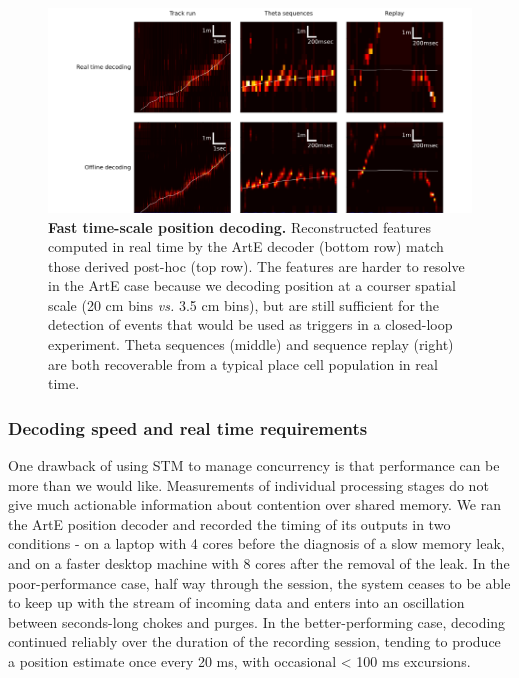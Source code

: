 \documentclass[]{article}
\begin{document}
\begin{figure}[htbp]
\centering
\includegraphics{./finalFigs/headToHeadDecoding.png}
\caption{\textbf{Fast time-scale position decoding.} Reconstructed
features computed in real time by the ArtE decoder (bottom row) match
those derived post-hoc (top row). The features are harder to resolve in
the ArtE case because we decoding position at a courser spatial scale
(20 cm bins \emph{vs.} 3.5 cm bins), but are still sufficient for the
detection of events that would be used as triggers in a closed-loop
experiment. Theta sequences (middle) and sequence replay (right) are
both recoverable from a typical place cell population in real time.}
\end{figure}

\subsubsection{Decoding speed and real time requirements}

One drawback of using STM to manage concurrency is that performance can
be more than we would like. Measurements of individual processing stages
do not give much actionable information about contention over shared
memory. We ran the ArtE position decoder and recorded the timing of its
outputs in two conditions - on a laptop with 4 cores before the
diagnosis of a slow memory leak, and on a faster desktop machine with 8
cores after the removal of the leak. In the poor-performance case, half
way through the session, the system ceases to be able to keep up with
the stream of incoming data and enters into an oscillation between
seconds-long chokes and purges. In the better-performing case, decoding
continued reliably over the duration of the recording session, tending
to produce a position estimate once every 20 ms, with occasional
\textless{} 100 ms excursions.
\end{document}

